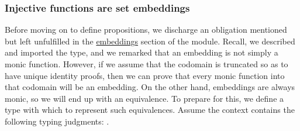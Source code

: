 \subsubsection{Injective functions are set embeddings}\label{injective-functions-are-set-embeddings}
Before moving on to define propositions, we discharge an obligation mentioned but left unfulfilled in the
\href{https://ualib.gitlab.io/Prelude.Inverses.html\#embeddings}{embeddings} section of the  module. Recall, we described and imported the  type, and we remarked that an embedding is not simply a monic function. However, if we assume that the codomain is truncated so as to have unique identity proofs, then we can prove that every monic function into that codomain will be an embedding. On the other hand, embeddings are always monic, so we will end up with an equivalence. To prepare for this, we define a type
 with which to represent such equivalences. Assume the context contains the following typing judgments: \AgdaSymbol{\{}\AgdaSpace{}\AgdaSpace{}%
\AgdaSymbol{:}\AgdaSpace{}%
\AgdaSymbol{\}\{}\AgdaSpace{}%
\AgdaSymbol{:}\AgdaSpace{}%
\AgdaSpace{}%
\AgdaSymbol{\}\{}\AgdaSpace{}%
\AgdaSymbol{:}\AgdaSpace{}%
\AgdaSpace{}%
\AgdaSymbol{\}}.
\ccpad
\begin{code}%
\>[0]\AgdaSpace{}%
\AgdaSymbol{:}\AgdaSpace{}%
\AgdaSpace{}%
\AgdaSpace{}%
\AgdaSpace{}%
\AgdaSpace{}%
\AgdaSpace{}%
\AgdaSpace{}%
\AgdaSpace{}%
\AgdaSpace{}%
\AgdaSpace{}%
\<%
\\
\>[0]\AgdaSpace{}%
\AgdaSpace{}%
\AgdaSpace{}%
\AgdaSymbol{=}\AgdaSpace{}%
\AgdaSymbol{(}\AgdaSpace{}%
\AgdaSpace{}%
\AgdaSymbol{)}\AgdaSpace{}%
\AgdaSpace{}%
\AgdaSymbol{(}\AgdaSpace{}%
\AgdaSpace{}%
\AgdaSymbol{)}\<%
\end{code}
